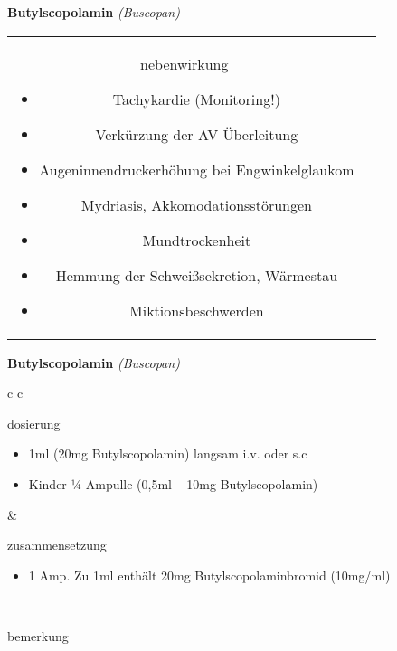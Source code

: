 \begin{frame}{
    \textbf{Butylscopolamin}
    \textit{(Buscopan)}
}
\begin{tabular}{c c}
\begin{beamercolorbox}[wd=\boxwidth\textwidth,ht=\boxheight\textheight,sep=1em]{nebenwirkung}
            \begin{itemize}
                \item Tachykardie (Monitoring!)
                \item Verkürzung der AV Überleitung
                \item Augeninnendruckerhöhung bei Engwinkelglaukom
                \item Mydriasis, Akkomodationsstörungen
                \item Mundtrockenheit
                \item Hemmung der Schweißsekretion, Wärmestau
                \item Miktionsbeschwerden
            \end{itemize}
        \end{beamercolorbox} \\
    \end{tabular}
\end{frame}

\begin{frame}{
    \textbf{Butylscopolamin}
    \textit{(Buscopan)}
}
    \begin{tabular}{c c}
        \begin{beamercolorbox}[wd=\boxwidth\textwidth,ht=\boxheight\textheight,sep=1em]{dosierung}
            \begin{itemize}
                \item 1ml (20mg Butylscopolamin) langsam i.v. oder s.c
                \item Kinder ¼ Ampulle (0,5ml – 10mg Butylscopolamin)	
            \end{itemize}
        \end{beamercolorbox} & 
        \begin{beamercolorbox}[wd=\boxwidth\textwidth,ht=\boxheight\textheight,sep=1em]{zusammensetzung}
            \begin{itemize}
                \item 1 Amp. Zu 1ml enthält 20mg Butylscopolaminbromid (10mg/ml)
            \end{itemize}
        \end{beamercolorbox} \\
        \begin{beamercolorbox}[wd=\textwidth,ht=\boxheight\textheight,sep=1em]{bemerkung}
        \end{beamercolorbox} \\
    \end{tabular}
\end{frame}

